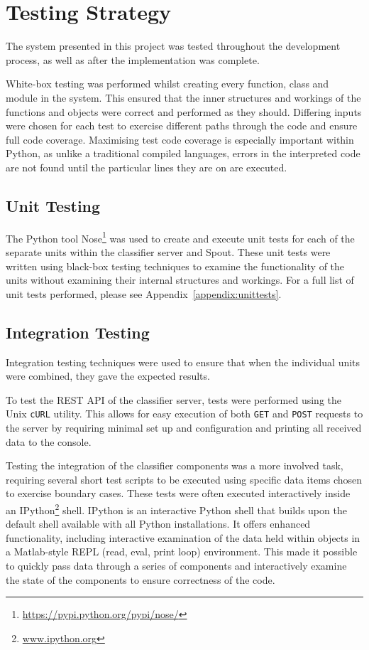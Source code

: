 \documentclass[11pt,a4paper]{report}
\begin{document}
\pagebreak

\chapter{Testing Strategy}
\label{chap:testing}

The system presented in this project was tested throughout the development process, as well as after the implementation was complete.

White-box testing was performed whilst creating every function, class and module in the system. This ensured that the inner structures and workings of the functions and objects were correct and performed as they should. Differing inputs were chosen for each test to exercise different paths through the code and ensure full code coverage. Maximising test code coverage is especially important within Python, as unlike a traditional compiled languages, errors in the interpreted code are not found until the particular lines they are on are executed.

\section{Unit Testing}

The Python tool Nose\footnote{\url{https://pypi.python.org/pypi/nose/}} was used to create and execute unit tests for each of the separate units within the classifier server and Spout. These unit tests were written using black-box testing techniques to examine the functionality of the units without examining their internal structures and workings. For a full list of unit tests performed, please see Appendix~\ref{appendix:unittests}.

\section{Integration Testing}
Integration testing techniques were used to ensure that when the individual units were combined, they gave the expected results.

To test the REST API of the classifier server, tests were performed using the Unix \verb+cURL+ utility. This allows for easy execution of both \texttt{GET} and \texttt{POST} requests to the server by requiring minimal set up and configuration and printing all received data to the console.

Testing the integration of the classifier components was a more involved task, requiring several short test scripts to be executed using specific data items chosen to exercise boundary cases. These tests were often executed interactively inside an IPython\footnote{\url{www.ipython.org}} shell. IPython is an interactive Python shell that builds upon the default shell available with all Python installations. It offers enhanced functionality, including interactive examination of the data held within objects in a Matlab-style REPL (read, eval, print loop) environment. This made it possible to quickly pass data through a series of components and interactively examine the state of the components to ensure correctness of the code.
\end{document}
